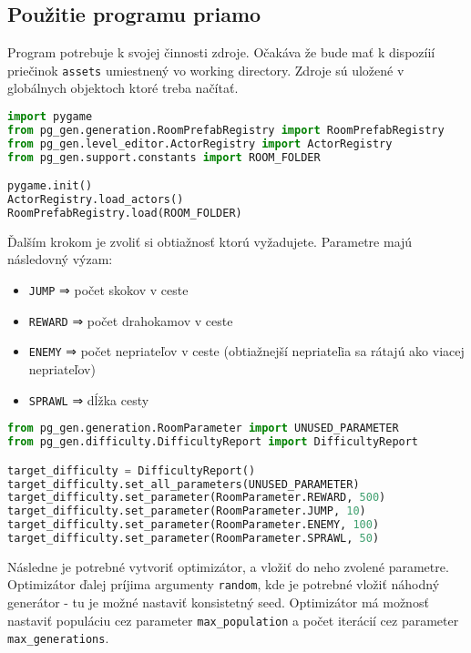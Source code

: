 
\subsection*{Použitie programu priamo}

Program potrebuje k svojej činnosti zdroje. Očakáva že bude mať k dispozíií priečinok \texttt{assets} umiestnený vo working directory. Zdroje sú uložené v globálnych objektoch ktoré treba načítať.

\begin{lstlisting}[language=python]
import pygame
from pg_gen.generation.RoomPrefabRegistry import RoomPrefabRegistry
from pg_gen.level_editor.ActorRegistry import ActorRegistry
from pg_gen.support.constants import ROOM_FOLDER

pygame.init()
ActorRegistry.load_actors()
RoomPrefabRegistry.load(ROOM_FOLDER)
\end{lstlisting}

Ďalším krokom je zvoliť si obtiažnosť ktorú vyžadujete. Parametre majú následovný výzam:

\begin{itemize}
    \item \texttt{JUMP} ⇒ počet skokov v ceste
    \item \texttt{REWARD} ⇒ počet drahokamov v ceste
    \item \texttt{ENEMY} ⇒ počet nepriateľov v ceste (obtiažnejší nepriateľia sa rátajú ako viacej nepriateľov)
    \item \texttt{SPRAWL} ⇒ dĺžka cesty
\end{itemize}

\begin{lstlisting}[language=python]
from pg_gen.generation.RoomParameter import UNUSED_PARAMETER
from pg_gen.difficulty.DifficultyReport import DifficultyReport

target_difficulty = DifficultyReport()
target_difficulty.set_all_parameters(UNUSED_PARAMETER)
target_difficulty.set_parameter(RoomParameter.REWARD, 500)
target_difficulty.set_parameter(RoomParameter.JUMP, 10)
target_difficulty.set_parameter(RoomParameter.ENEMY, 100)
target_difficulty.set_parameter(RoomParameter.SPRAWL, 50)
\end{lstlisting}



Následne je potrebné vytvoriť optimizátor, a vložiť do neho zvolené parametre. Optimizátor ďalej príjima argumenty \texttt{random}, kde je potrebné vložiť náhodný generátor - tu je možné nastaviť konsistetný seed. Optimizátor má možnosť nastaviť populáciu cez parameter \texttt{max\_population} a počet iterácií cez parameter \texttt{max\_generations}.

